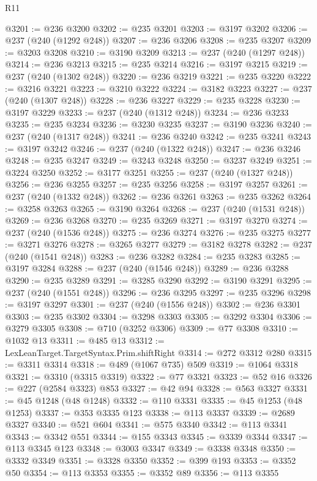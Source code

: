 \begin{lexlean}{R11}
\begin{coremodule}
{{{{{{{{{{{{{{{{{{{{{{{{{{{{{{{{{{{{{{{{{{{{{{{{{{{{{{{{{{{{{{{{{{{{{{{{{{{{{{{{{{{{{{{{{{{{{{{{{{{{{{{{{{@3201 := @236 @3200
@3202 := @235 @3201
@3203 := @3197 @3202
@3206 := @237 (@240 (@1292 @248))
@3207 := @236 @3206
@3208 := @235 @3207
@3209 := @3203 @3208
@3210 := @3190 @3209
@3213 := @237 (@240 (@1297 @248))
@3214 := @236 @3213
@3215 := @235 @3214
@3216 := @3197 @3215
@3219 := @237 (@240 (@1302 @248))
@3220 := @236 @3219
@3221 := @235 @3220
@3222 := @3216 @3221
@3223 := @3210 @3222
@3224 := @3182 @3223
@3227 := @237 (@240 (@1307 @248))
@3228 := @236 @3227
@3229 := @235 @3228
@3230 := @3197 @3229
@3233 := @237 (@240 (@1312 @248))
@3234 := @236 @3233
@3235 := @235 @3234
@3236 := @3230 @3235
@3237 := @3190 @3236
@3240 := @237 (@240 (@1317 @248))
@3241 := @236 @3240
@3242 := @235 @3241
@3243 := @3197 @3242
@3246 := @237 (@240 (@1322 @248))
@3247 := @236 @3246
@3248 := @235 @3247
@3249 := @3243 @3248
@3250 := @3237 @3249
@3251 := @3224 @3250
@3252 := @3177 @3251
@3255 := @237 (@240 (@1327 @248))
@3256 := @236 @3255
@3257 := @235 @3256
@3258 := @3197 @3257
@3261 := @237 (@240 (@1332 @248))
@3262 := @236 @3261
@3263 := @235 @3262
@3264 := @3258 @3263
@3265 := @3190 @3264
@3268 := @237 (@240 (@1531 @248))
@3269 := @236 @3268
@3270 := @235 @3269
@3271 := @3197 @3270
@3274 := @237 (@240 (@1536 @248))
@3275 := @236 @3274
@3276 := @235 @3275
@3277 := @3271 @3276
@3278 := @3265 @3277
@3279 := @3182 @3278
@3282 := @237 (@240 (@1541 @248))
@3283 := @236 @3282
@3284 := @235 @3283
@3285 := @3197 @3284
@3288 := @237 (@240 (@1546 @248))
@3289 := @236 @3288
@3290 := @235 @3289
@3291 := @3285 @3290
@3292 := @3190 @3291
@3295 := @237 (@240 (@1551 @248))
@3296 := @236 @3295
@3297 := @235 @3296
@3298 := @3197 @3297
@3301 := @237 (@240 (@1556 @248))
@3302 := @236 @3301
@3303 := @235 @3302
@3304 := @3298 @3303
@3305 := @3292 @3304
@3306 := @3279 @3305
@3308 := @710 (@3252 @3306)
@3309 := @77 @3308
@3310 := @1032 @13
@3311 := @485 @13
@3312 := LexLeanTarget.TargetSyntax.Prim.shiftRight
@3314 := @272 @3312 @280
@3315 := @3311 @3314
@3318 := @489 (@1067 @735) @509
@3319 := @1064 @3318
@3321 := @3310 (@3315 @3319)
@3322 := @77 @3321
@3323 := @52 @16
@3326 := @227 (@2584 @3323) @853
@3327 := @42 @94
@3328 := @563 @3327
@3331 := @45 @1248 (@48 @1248)
@3332 := @110 @3331
@3335 := @45 @1253 (@48 @1253)
@3337 := @353 @3335 @123
@3338 := @113 @3337
@3339 := @2689 @3327
@3340 := @521 @604
@3341 := @575 @3340
@3342 := @113 @3341
@3343 := @3342 @551
@3344 := @155 @3343
@3345 := @3339 @3344
@3347 := @113 @3345 @123
@3348 := @3003 @3347
@3349 := @3338 @3348
@3350 := @3332 @3349
@3351 := @3328 @3350
@3352 := @399 @193
@3353 := @3352 @50
@3354 := @113 @3353
@3355 := @3352 @89
@3356 := @113 @3355
}}}}}}}}}}}}}}}}}}}}}}}}}}}}}}}}}}}}}}}}}}}}}}}}}}}}}}}}}}}}}}}}}}}}}}}}}}}}}}}}}}}}}}}}}}}}}}}}}}}}}}}}}}
\end{coremodule}
\end{lexlean}
